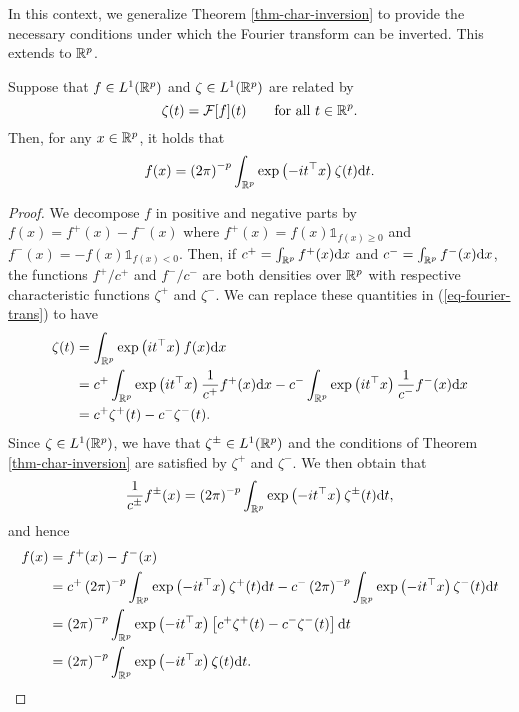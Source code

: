 In this context, we generalize Theorem \ref{thm-char-inversion} to provide the necessary conditions under which the Fourier transform can be inverted. This extends \cite[Corollary 2.4.3]{kolassa2006series} to ${\mathbb{R}^p}$.

\begin{corollary} \label{corr-fourier-inv}
    Suppose that $f \in L^1({\mathbb{R}^p})$ and $\zeta \in L^1({\mathbb{R}^p})$ are related by
    \begin{equation}\label{eq-fourier-trans}
        \zeta(t) = \mathcal{F}[f](t) \ \ \ \ \ \ {\textrm{for all }} t \in {\mathbb{R}^p}.
    \end{equation}
    Then, for any $x \in {\mathbb{R}^p}$, it holds that
    \begin{equation} \label{eq-fourier-inv}
        f(x) = \left(2\pi\right)^{-p}\int_{\mathbb{R}^p} \exp\left(-i t^\top x\right) \zeta(t) \text{d} t.
    \end{equation}
\end{corollary}

\begin{proof}
    We decompose $f$ in positive and negative parts by $f(x) = f^+(x) - f^-(x)$ where $f^+(x) = f(x) \mathbb{1}_{f(x) \geq 0}$ and $f^-(x) = -f(x) \mathbb{1}_{f(x) < 0}$. Then, if $c^+ = \int_{\mathbb{R}^p} f^+(x) \text{d} x$ and $c^- = \int_{\mathbb{R}^p} f^-(x) \text{d} x$, the functions $f^+ / c^+$ and $f^- / c^-$ are both densities over ${\mathbb{R}^p}$ with respective characteristic functions $\zeta^+$ and $\zeta^-$. We can replace these quantities in (\ref{eq-fourier-trans}) to have
    \begin{align*}
        \zeta(t) 
        &= \int_{\mathbb{R}^p} \exp\left(it^\top x\right)f(x)\text{d} x \\
        &= c^+ \int_{\mathbb{R}^p} \exp\left(it^\top x\right) \frac{1}{c^+}f^+(x)\text{d} x - c^- \int_{\mathbb{R}^p} \exp\left(it^\top x\right) \frac{1}{c^-}f^-(x)\text{d} x\\
        &= c^+ \zeta^+(t) - c^-\zeta^-(t).
    \end{align*}
    Since $\zeta \in L^1({\mathbb{R}^p})$, we have that $\zeta^\pm \in L^1({\mathbb{R}^p})$ and the conditions of Theorem \ref{thm-char-inversion} are satisfied by $\zeta^+$ and $\zeta^-$. We then obtain that
    \begin{equation*}
        \frac{1}{c^\pm} f^\pm(x) = \left(2\pi\right)^{-p}\int_{\mathbb{R}^p} \exp\left(-i t^\top x\right) \zeta^\pm(t) \text{d} t,
    \end{equation*}
    and hence
    \begin{align*}
        f(x) 
        &= f^+(x) - f^-(x) \\
        &= c^+ \left(2\pi\right)^{-p}\int_{\mathbb{R}^p} \exp\left(-i t^\top x\right) \zeta^+(t) \text{d} t
         - c^- \left(2\pi\right)^{-p}\int_{\mathbb{R}^p} \exp\left(-i t^\top x\right) \zeta^-(t) \text{d} t \\
        &= \left(2\pi\right)^{-p}\int_{\mathbb{R}^p} \exp\left(-i t^\top x\right) \left[ c^+\zeta^+(t) - c^-\zeta^-(t)\right] \text{d} t\\
        &= \left(2\pi\right)^{-p}\int_{\mathbb{R}^p} \exp\left(-i t^\top x\right) \zeta(t) \text{d} t. \qedhere
    \end{align*}
\end{proof}

